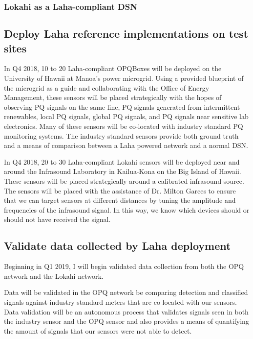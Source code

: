 
\subsubsection{Lokahi as a Laha-compliant DSN}

\subsection{Deploy Laha reference implementations on test sites}
In Q4 2018, 10 to 20 Laha-compliant OPQBoxes will be deployed on the University of Hawaii at Manoa's power microgrid. Using a provided blueprint of the microgrid as a guide and collaborating with the Office of Energy Management, these sensors will be placed strategically with the hopes of observing PQ signals on the same line, PQ signals generated from intermittent renewables, local PQ signals, global PQ signals, and PQ signals near sensitive lab electronics. Many of these sensors will be co-located with industry standard PQ monitoring systems. The industry standard sensors provide both ground truth and a means of comparison between a Laha powered network and a normal DSN. 

In Q4 2018,  20 to 30 Laha-compliant Lokahi sensors will be deployed near and around the Infrasound Laboratory in Kailua-Kona on the Big Island of Hawaii. These sensors will be placed strategically around a calibrated infrasound source. The sensors will be placed with the assistance of Dr. Milton Garces to ensure that we can target sensors at different distances by tuning the amplitude and frequencies of the infrasound signal. In this way, we know which devices should or should not have received the signal.

\subsection{Validate data collected by Laha deployment}
Beginning in Q1 2019, I will begin validated data collection from both the OPQ network and the Lokahi network. 

Data will be validated in the OPQ network be comparing detection and classified signals against industry standard meters that are co-located with our sensors. Data validation will be an autonomous process that validates signals seen in both the industry sensor and the OPQ sensor and also provides a means of quantifying the amount of signals that our sensors were not able to detect. 

